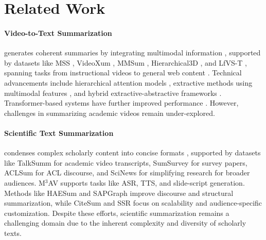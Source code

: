 \section{Related Work}
\paragraph{Video-to-Text Summarization} generates coherent summaries by integrating multimodal information \cite{hua2024v2xum}, supported by datasets like MSS \cite{li-etal-2017-multi}, VideoXum \cite{10334011}, MMSum \cite{qiu2024mmsum}, Hierarchical3D \cite{papalampidi-lapata-2023-hierarchical3d}, and \mbox{LfVS-T} \cite{argaw2024scaling}, spanning tasks from instructional videos to general web content \cite{li-etal-2017-multi, zhou2018towards, li2019video, li-etal-2020-vmsmo, liu-wan-2021-video, fu-etal-2021-mm, krubinski-pecina-2023-mlask, han2023shot2story20k, he2023align, hua2024v2xum, islam2024video, qiu2024mmsum}. Technical advancements include hierarchical attention models \cite{sanabria2018how2}, extractive methods using multimodal features \cite{cho-etal-2021-streamhover, krubinski-pecina-2023-mlask}, and hybrid extractive-abstractive frameworks \cite{9939279, papalampidi-lapata-2023-hierarchical3d}. Transformer-based systems have further improved performance \cite{krubinski-pecina-2023-mlask,li-etal-2020-vmsmo,10.1145/3474085.3475321,mahon-lapata-2024-modular}. However, challenges in summarizing academic videos remain under-explored.

\paragraph{Scientific Text Summarization} condenses complex scholarly content into concise formats \cite{cachola-etal-2020-tldr, ju-etal-2021-leveraging-information, sotudeh-goharian-2022-tstr, pu-demberg-2023-chatgpt}, supported by datasets like TalkSumm \cite{lev-etal-2019-talksumm} for academic video transcripts, SumSurvey \cite{liu-etal-2024-sumsurvey} for survey papers, ACLSum \cite{takeshita-etal-2024-aclsum} for ACL discourse, and SciNews \cite{pu-etal-2024-scinews} for simplifying research for broader audiences. M$^3$AV \cite{chen-etal-2024-m3av} supports tasks like ASR, TTS, and slide-script generation. Methods like HAESum \cite{zhao-etal-2024-hierarchical} and SAPGraph \cite{qi-etal-2022-sapgraph} improve discourse and structural summarization, while CiteSum \cite{mao-etal-2022-citesum} and SSR \cite{fatima-strube-2023-cross} focus on scalability and audience-specific customization. Despite these efforts, scientific summarization remains a challenging domain due to the inherent complexity and diversity of scholarly texts. 

